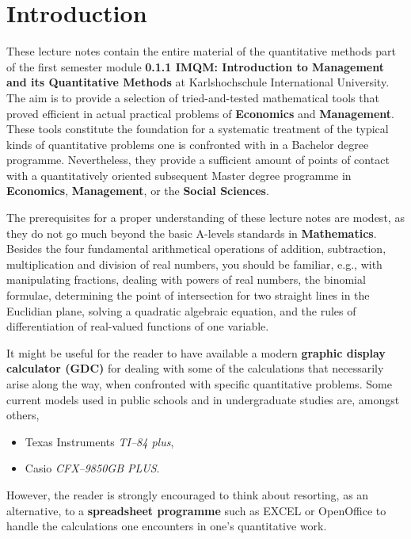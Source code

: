 \chapter*{Introduction}
These lecture notes contain the entire material of the 
quantitative methods part of the first semester module {\bf 0.1.1 
IMQM: Introduction to Management and its Quantitative Methods} at 
Karlshochschule International University. The aim is to provide a 
selection of tried-and-tested mathematical tools that proved 
efficient in actual practical problems of {\bf Economics} and {\bf 
Management}. These tools constitute the foundation for a 
systematic treatment of the typical kinds of quantitative problems 
one is confronted with in a Bachelor degree programme. 
Nevertheless, they provide a sufficient amount of points of 
contact with a quantitatively oriented subsequent Master degree 
programme in {\bf Economics}, {\bf Management}, or the {\bf Social 
Sciences}.

\medskip
\noindent
The prerequisites for a proper understanding of these lecture 
notes are modest, as they do not go much beyond the basic A-levels 
standards in {\bf Mathematics}. Besides the four fundamental 
arithmetical operations of addition, subtraction, multiplication 
and division of real numbers, you should be familiar, e.g., with 
manipulating fractions, dealing with powers of real numbers, the 
binomial formulae, determining the point of intersection for two 
straight lines in the Euclidian plane, solving a quadratic 
algebraic equation, and the rules of differentiation of 
real-valued functions of one variable.

\medskip
\noindent
It might be useful for the reader to have available a modern 
{\bf graphic display calculator (GDC)} for dealing with some of 
the calculations that necessarily arise along the way, when 
confronted with specific quantitative problems. Some current 
models used in public schools and in undergraduate studies are, 
amongst others,
%
\begin{itemize}
\item Texas Instruments \emph{TI--84 plus},
\item Casio \emph{CFX--9850GB PLUS}.
\end{itemize}
%
However, the reader is strongly encouraged to think about 
resorting, as an alternative, to a {\bf spreadsheet programme} 
such as EXCEL or OpenOffice to handle the calculations one 
encounters in one's quantitative work.


